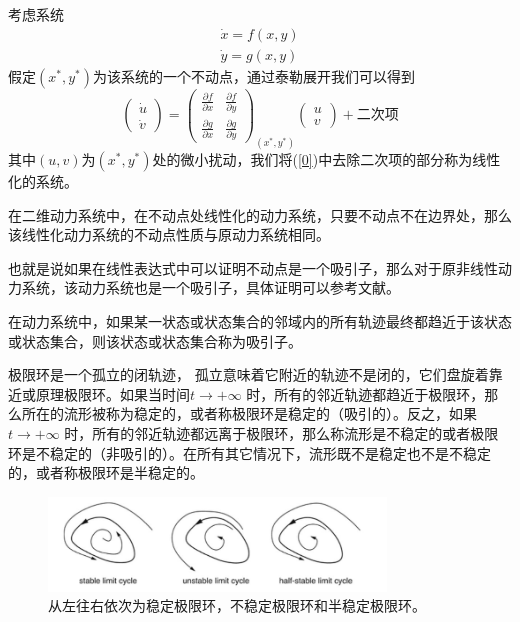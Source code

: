 考虑系统
\begin{equation}
    \begin{aligned}
        \dot{x}=f(x,y) \\
        \dot{y}=g(x,y)
    \end{aligned}
\end{equation}
假定$(x^*,y^*)$为该系统的一个不动点，通过泰勒展开我们可以得到
\begin{equation}\label{0}
    \begin{pmatrix}
        \dot{u} \\
        \dot{v}
    \end{pmatrix}=
    \begin{pmatrix}
        \frac{\partial f}{\partial x} & \frac{\partial f}{\partial y} \\
        \frac{\partial g}{\partial x} & \frac{\partial g}{\partial y}
    \end{pmatrix}_{(x^*,y^*)}\begin{pmatrix}
        u \\ v
    \end{pmatrix}+\text{二次项}
\end{equation}
其中$(u,v)$为$(x^*,y^*)$处的微小扰动，我们将(\ref{0})中去除二次项的部分称为线性化的系统。
\begin{prop}
    在二维动力系统中，在不动点处线性化的动力系统，只要不动点不在边界处，那么该线性化动力系统的不动点性质与原动力系统相同。
\end{prop}

也就是说如果在线性表达式中可以证明不动点是一个吸引子，那么对于原非线性动力系统，该动力系统也是一个吸引子，具体证明可以参考文献\cite{andronov1974qualitative}。
\begin{defn}[吸引子]
    在动力系统中，如果某一状态或状态集合的邻域内的所有轨迹最终都趋近于该状态或状态集合，则该状态或状态集合称为吸引子。
\end{defn}

\begin{defn}[极限环]
    极限环是一个孤立的闭轨迹， 孤立意味着它附近的轨迹不是闭的，它们盘旋着靠近或原理极限环。如果当时间$t\to +\infty$ 时，所有的邻近轨迹都趋近于极限环，那么所在的流形被称为稳定的，或者称极限环是稳定的（吸引的）。反之，如果$t\to +\infty$ 时，所有的邻近轨迹都远离于极限环，那么称流形是不稳定的或者极限环是不稳定的（非吸引的）。在所有其它情况下，流形既不是稳定也不是不稳定的，或者称极限环是半稳定的。
\end{defn}
\begin{figure}[H]
    \centering
    \includegraphics[width=0.8\textwidth]{Img/limit_cycle.png}
    \caption{从左往右依次为稳定极限环，不稳定极限环和半稳定极限环。}
    \label{fig:limit_cycle}
\end{figure}

